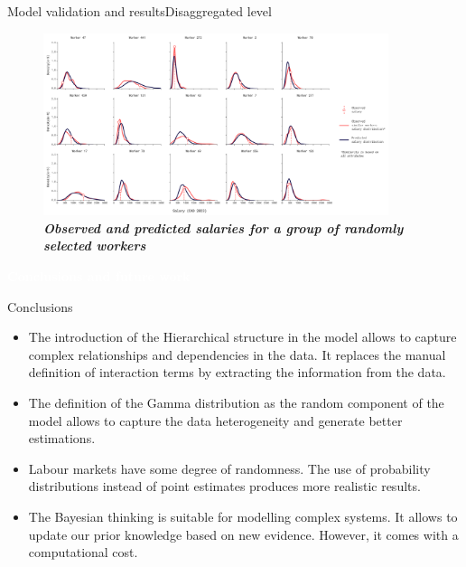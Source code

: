 \documentclass[aspectratio=169, xcolor=dvipsnames]{beamer}
\begin{document}
\begin{frame}{Model validation and results}{Disaggregated level}
    \vspace*{-20pt}
    \begin{figure}
        \centering
        \includegraphics[width=0.9\textwidth]{./images/workers.png}
        \captionsetup{labelformat=empty}
        \setlength{\abovecaptionskip}{-2pt}
        \caption{\fontsize{8pt}{8pt}\selectfont \textbf{\textit{Observed and predicted salaries for a group of randomly selected workers}}}
    \end{figure}
\end{frame}

{
\begin{frame}
    \begin{center}
        \textcolor{white}{{\fontsize{22pt}{14pt}\selectfont \textbf{Conclusions and future work}}}\\
    \end{center}
\end{frame}
}

\begin{frame}{Conclusions}
    \vspace*{-20pt}
    \begin{itemize}
        \setlength{\itemsep}{10pt}
        \item \fontsize{10pt}{12pt}\selectfont The introduction of the Hierarchical structure in the model allows to capture complex relationships and dependencies in the data. It replaces the manual definition of interaction terms by extracting the information from the data.
        \item \fontsize{10pt}{12pt}\selectfont The definition of the Gamma distribution as the random component of the model allows to capture the data heterogeneity and generate better estimations.
        \item \fontsize{10pt}{12pt}\selectfont Labour markets have some degree of randomness. The use of probability distributions instead of point estimates produces more realistic results.
        \item \fontsize{10pt}{12pt}\selectfont The Bayesian thinking is suitable for modelling complex systems. It allows to update our prior knowledge based on new evidence. However, it comes with a computational cost.
    \end{itemize}
\end{frame}
\end{document}
